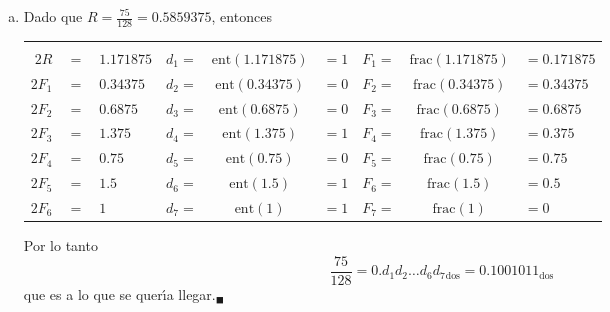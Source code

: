 \begin{solucion}
\begin{enumerate}[(a)]
  \item Dado que $R = \frac{75}{128} = 0.5859375$, entonces
  \begin{center}
   \begin{tabular}{rclrclrcl}
    & & & \hspace{1.1cm} & & \hspace{1.1cm} \\
    $2R$ & $=$ & $1.171875$ & $d_1 =$ & $\text{ent}(1.171875)$ & $=1$ & $F_1 =$ & $\text{frac}(1.171875)$ & $=0.171875$ \\
    $2F_1$ & $=$ & $0.34375$ & $d_2 =$ & $\text{ent}(0.34375)$ & $=0$ & $F_2 =$ & $\text{frac}(0.34375)$ & $=0.34375$ \\
    $2F_2$ & $=$ & $0.6875$ & $d_3 =$ & $\text{ent}(0.6875)$ & $=0$ & $F_3 =$ & $\text{frac}(0.6875)$ & $=0.6875$ \\
    $2F_3$ & $=$ & $1.375$ & $d_4 =$ & $\text{ent}(1.375)$ & $=1$ & $F_4 =$ & $\text{frac}(1.375)$ & $=0.375$ \\
    $2F_4$ & $=$ & $0.75$ & $d_5 =$ & $\text{ent}(0.75)$ & $=0$ & $F_5 =$ & $\text{frac}(0.75)$ & $=0.75$ \\
    $2F_5$ & $=$ & $1.5$ & $d_6 =$ & $\text{ent}(1.5)$ & $=1$ & $F_6 =$ & $\text{frac}(1.5)$ & $=0.5$ \\
    $2F_6$ & $=$ & $1$ & $d_7 =$ & $\text{ent}(1)$ & $=1$ & $F_7 =$ & $\text{frac}(1)$ & $=0$ \\
   \end{tabular}
  \end{center}
  Por lo tanto
  \begin{equation*}
   \frac{75}{128} = 0.d_1d_2\ldots d_6d_7{}_{\text{dos}} = 0.1001011_{\text{dos}}
  \end{equation*}
  que es a lo que se quer\'{\i}a llegar.${}_{\blacksquare}$
 \end{enumerate}
\end{solucion}
